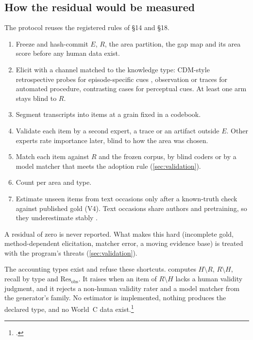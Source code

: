 \subsection{How the residual would be measured}

\evfut{} The protocol reuses the registered rules of  §14 and §18.
\begin{enumerate}[noitemsep]
  \item Freeze and hash-commit $E$, $R$, the area partition, the gap map and its area score before
    any human data exist.
  \item Elicit with a channel matched to the knowledge type: CDM-style retrospective probes for
    episode-specific cues \parencite{klein1989critical}, observation or traces for automated
    procedure, contrasting cases for perceptual cues. At least one arm stays blind to $R$.
  \item Segment transcripts into items at a grain fixed in a codebook.
  \item Validate each item by a second expert, a trace or an artifact outside $E$. Other experts
    rate importance later, blind to how the area was chosen.
  \item Match each item against $R$ and the frozen corpus, by blind coders or by a model matcher
    that meets the adoption rule (\cref{sec:validation}).
  \item Count per area and type.
  \item Estimate unseen items from text occasions only after a known-truth check against published
    gold (V4). Text occasions share authors and pretraining, so they underestimate stably
    \parencite{chao1987estimating,briand2000comprehensive}.
\end{enumerate}
A residual of zero is never reported. What makes this hard (incomplete gold, method-dependent
elicitation, matcher error, a moving evidence base) is treated with the program's threats
(\cref{sec:validation}).

\begin{evobsbox}
  The accounting types exist and refuse these shortcuts.  computes
  $H \setminus R$, $R \setminus H$, recall by type and $\mathrm{Res}_{\mathrm{obs}}$. It raises
   when an item of $R \setminus H$ lacks a human validity judgment, and it
  rejects a non-human validity rater and a model matcher from the generator's family. No estimator
  is implemented, nothing produces the declared  type, and no World~C data
  exist.\footnote{.}
\end{evobsbox}

